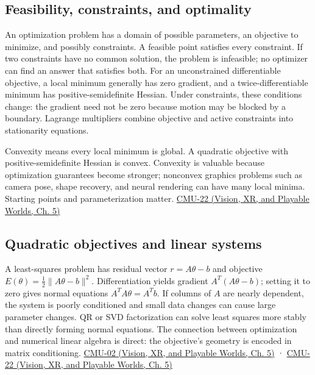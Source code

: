 \subsection{Feasibility, constraints, and optimality}\label{04-visual-computing-ii-ch029-feasibility-constraints-and-optimality}

An optimization problem has a domain of possible parameters, an objective to minimize, and possibly constraints. A feasible point satisfies every constraint. If two constraints have no common solution, the problem is infeasible; no optimizer can find an answer that satisfies both. For an unconstrained differentiable objective, a local minimum generally has zero gradient, and a twice-differentiable minimum has positive-semidefinite Hessian. Under constraints, these conditions change: the gradient need not be zero because motion may be blocked by a boundary. Lagrange multipliers combine objective and active constraints into stationarity equations.

Convexity means every local minimum is global. A quadratic objective with positive-semidefinite Hessian is convex. Convexity is valuable because optimization guarantees become stronger; nonconvex graphics problems such as camera pose, shape recovery, and neural rendering can have many local minima. Starting points and parameterization matter. \href{../07-Vision-XR-and-Playable-Worlds/main.pdf\#nameddest=04-visual-computing-ii-ch036-cmu-22---optimization}{CMU-22 (Vision, XR, and Playable Worlds, Ch. 5)}

\subsection{Quadratic objectives and linear systems}\label{04-visual-computing-ii-ch029-quadratic-objectives-and-linear-systems}

A least-squares problem has residual vector \(r=A\theta-b\) and objective \(E(\theta)=\tfrac12\|A\theta-b\|^2\). Differentiation yields gradient \(A^T(A\theta-b)\); setting it to zero gives normal equations \(A^TA\theta=A^Tb\). If columns of \(A\) are nearly dependent, the system is poorly conditioned and small data changes can cause large parameter changes. QR or SVD factorization can solve least squares more stably than directly forming normal equations. The connection between optimization and numerical linear algebra is direct: the objective's geometry is encoded in matrix conditioning. \href{../07-Vision-XR-and-Playable-Worlds/main.pdf\#nameddest=04-visual-computing-ii-ch036-cmu-02---linear-algebra-preview}{CMU-02 (Vision, XR, and Playable Worlds, Ch. 5)} · \href{../07-Vision-XR-and-Playable-Worlds/main.pdf\#nameddest=04-visual-computing-ii-ch036-cmu-22---optimization}{CMU-22 (Vision, XR, and Playable Worlds, Ch. 5)}

